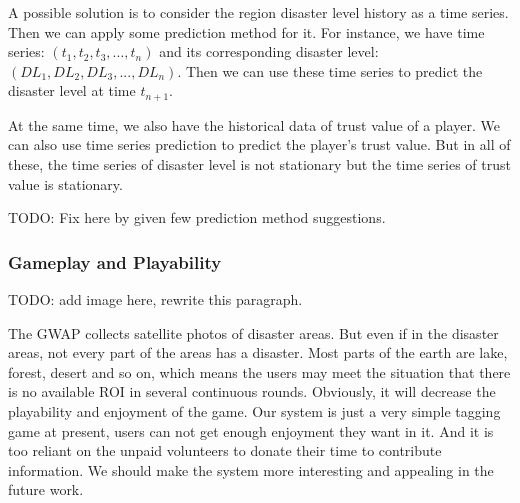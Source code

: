 A possible solution is to consider the region disaster level history as a time series. Then we can apply
some prediction method for it. For instance, we have time series: $(t_1, t_2, t_3, ..., t_n)$
and its corresponding disaster level: $(DL_1, DL_2, DL_3, ..., DL_n)$.
Then we can use these time series to predict the disaster level at time $t_{n+1}$.

At the same time, we also have the historical data of trust value of a player. We can also
use time series prediction to predict the player's trust value. But in all of these, the time series
of disaster level is not stationary but the time series of trust value is stationary.

TODO: Fix here by given few prediction method suggestions.

\subsubsection{Gameplay and Playability}

TODO: add image here, rewrite this paragraph.

The GWAP collects satellite photos of disaster areas. But even if in the disaster areas, 
not every part of the areas has a disaster. Most parts of the earth are lake, forest, 
desert and so on, which means the users may meet the situation that there is no available 
ROI in several continuous rounds. Obviously, it will decrease the playability and enjoyment of the game.
Our system is just a very simple tagging game at present, users can not get enough enjoyment they want in it. 
And it is too reliant on the unpaid volunteers to donate their time to contribute information. 
We should make the system more interesting and appealing in the future work.
